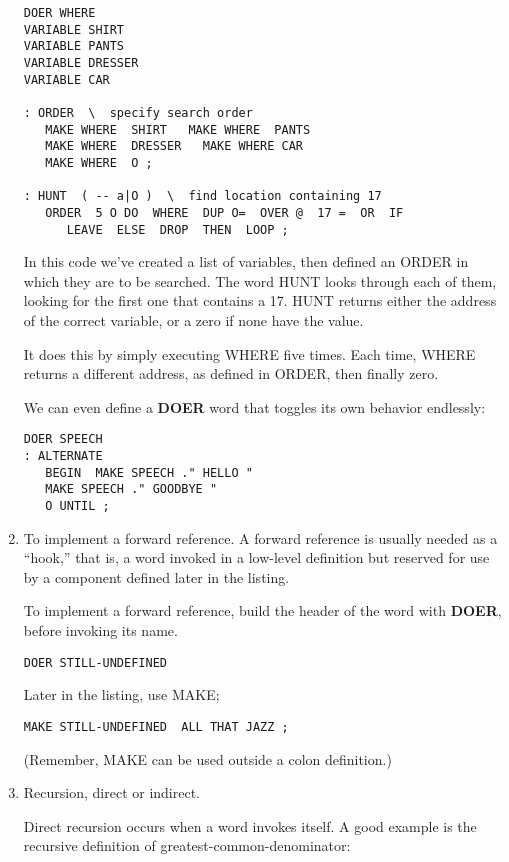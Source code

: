 \begin{enumerate}
\begin{verbatim}
DOER WHERE
VARIABLE SHIRT
VARIABLE PANTS
VARIABLE DRESSER
VARIABLE CAR

: ORDER  \  specify search order
   MAKE WHERE  SHIRT   MAKE WHERE  PANTS
   MAKE WHERE  DRESSER   MAKE WHERE CAR
   MAKE WHERE  O ;

: HUNT  ( -- a|O )  \  find location containing 17
   ORDER  5 O DO  WHERE  DUP O=  OVER @  17 =  OR  IF
      LEAVE  ELSE  DROP  THEN  LOOP ;
\end{verbatim}

In this code we've created a list of variables, then defined an ORDER in
which they are to be searched. The word HUNT looks through each of them,
looking for the first one that contains a 17. HUNT returns either the
address of the correct variable, or a zero if none have the value.

It does this by simply executing WHERE five times. Each time, WHERE
returns a different address, as defined in ORDER, then finally zero.

We can even define a \textbf{DOER} word that toggles its own behavior endlessly:

\begin{verbatim}
DOER SPEECH
: ALTERNATE
   BEGIN  MAKE SPEECH ." HELLO "
   MAKE SPEECH ." GOODBYE "
   O UNTIL ;
\end{verbatim}

\item To implement a forward reference. A forward reference is usually needed as
a ``hook,'' that is, a word invoked in a low-level definition but reserved for
use by a component defined later in the listing.

To implement a forward reference, build the header of the word with \textbf{DOER},
before invoking its name.

\begin{verbatim}
DOER STILL-UNDEFINED
\end{verbatim}
Later in the listing, use MAKE;

\begin{verbatim}
MAKE STILL-UNDEFINED  ALL THAT JAZZ ;
\end{verbatim}
(Remember, MAKE can be used outside a colon definition.)

\item Recursion, direct or indirect.

Direct recursion occurs when a word invokes itself. A good example is the
recursive definition of greatest-common-denominator:


\end{enumerate}
